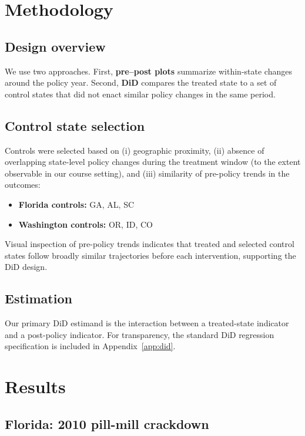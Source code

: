\documentclass[11pt]{article}
\begin{document}
\section{Methodology}

\subsection{Design overview}

We use two approaches. First, \textbf{pre--post plots} summarize within-state changes around the policy year. Second, \textbf{DiD} compares the treated state to a set of control states that did not enact similar policy changes in the same period.

\subsection{Control state selection}

Controls were selected based on (i) geographic proximity, (ii) absence of overlapping state-level policy changes during the treatment window (to the extent observable in our course setting), and (iii) similarity of pre-policy trends in the outcomes:
\begin{itemize}[leftmargin=*]
    \item \textbf{Florida controls:} GA, AL, SC
    \item \textbf{Washington controls:} OR, ID, CO
\end{itemize}
Visual inspection of pre-policy trends indicates that treated and selected control states follow broadly similar trajectories before each intervention, supporting the DiD design.

\subsection{Estimation}

Our primary DiD estimand is the interaction between a treated-state indicator and a post-policy indicator. For transparency, the standard DiD regression specification is included in Appendix~\ref{app:did}.

\section{Results}

\subsection{Florida: 2010 pill-mill crackdown}
\end{document}
